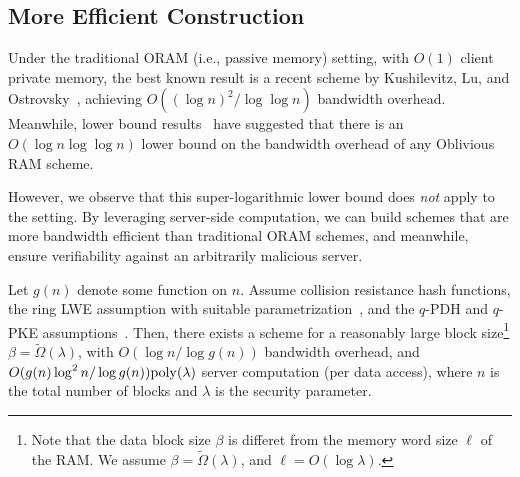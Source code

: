 \subsection{More Efficient \nameshort Construction}
Under the traditional ORAM (i.e., passive memory) setting, 
with $O(1)$ %
client private memory,
the best known result is a recent scheme 
by Kushilevitz, Lu, and Ostrovsky~\cite{oram03},
achieving $O((\log n)^2/ \log\log n)$ bandwidth overhead. 
Meanwhile, lower bound results~\cite{oram00,oramlower}
have suggested that 
there is an $O(\log n \log \log n)$
lower bound on the bandwidth overhead of any Oblivious RAM scheme.

However, we observe that this super-logarithmic lower bound
does {\it not} apply to the \nameshort setting.
By leveraging server-side computation,
we can build \nameshort
schemes that are more bandwidth efficient than
traditional ORAM schemes, and meanwhile, ensure
verifiability against an arbitrarily malicious server.


\begin{thm}
Let $g(n)$ denote some function on $n$.
Assume collision resistance hash functions, 
the ring LWE assumption with 
suitable parametrization~\cite{fhe10,BGV12},
and the $q$-PDH and $q$-PKE assumptions~\cite{spanprogram}.
Then, there exists a \nameshort scheme for a reasonably
large block size\footnote{
Note that the \nameshort data block size $\beta$ is differet from the
memory word size $\ell$ of the RAM.
We assume $\beta = \tilde{\Omega}(\lambda)$, and 
$\ell = O(\log \lambda)$.
}
 $\beta = \tilde{\Omega}(\lambda)$,
with $O(\log n / \log g(n))$ 
bandwidth overhead, and 
$O(g(n) \log^2 n / \log g(n)){\rm poly}(\lambda)$ server computation 
(per data access), where $n$ is the total number of blocks
and $\lambda$ is the security parameter.
\label{thm:vos}
\end{thm}

